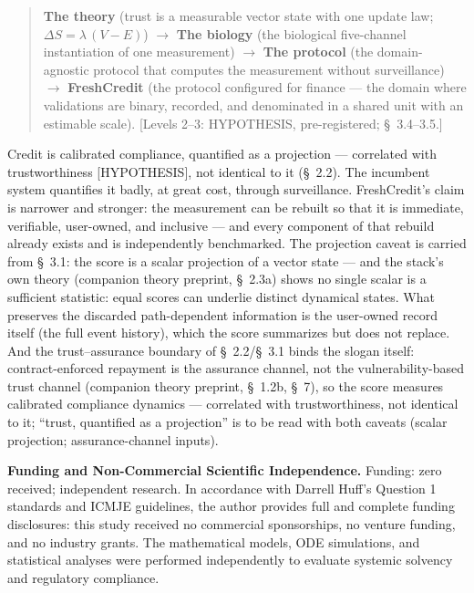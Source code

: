 \documentclass[
]{article}
\begin{document}
\begin{quote}
\textbf{The theory} (trust is a measurable vector state with one update
law; \(\Delta S = \lambda\,(V - E)\)) \(\rightarrow\) \textbf{The
biology} (the biological five-channel instantiation of one measurement)
\(\rightarrow\) \textbf{The protocol} (the domain-agnostic protocol that
computes the measurement without surveillance) \(\rightarrow\)
\textbf{FreshCredit} (the protocol configured for finance --- the domain
where validations are binary, recorded, and denominated in a shared unit
with an estimable scale). {[}Levels 2--3: HYPOTHESIS, pre-registered;
§~3.4--3.5.{]}
\end{quote}

Credit is calibrated compliance, quantified as a projection ---
correlated with trustworthiness {[}HYPOTHESIS{]}, not identical to it
(§~2.2). The incumbent system quantifies it badly, at great cost,
through surveillance. FreshCredit's claim is narrower and stronger: the
measurement can be rebuilt so that it is immediate, verifiable,
user-owned, and inclusive --- and every component of that rebuild
already exists and is independently benchmarked. The projection caveat
is carried from §~3.1: the score is a scalar projection of a vector
state --- and the stack's own theory (companion theory preprint, §~2.3a)
shows no single scalar is a sufficient statistic: equal scores can
underlie distinct dynamical states. What preserves the discarded
path-dependent information is the user-owned record itself (the full
event history), which the score summarizes but does not replace. And the
trust--assurance boundary of §~2.2/§~3.1 binds the slogan itself:
contract-enforced repayment is the assurance channel, not the
vulnerability-based trust channel (companion theory preprint, §~1.2b,
§~7), so the score measures calibrated compliance dynamics ---
correlated with trustworthiness, not identical to it; ``trust,
quantified as a projection'' is to be read with both caveats (scalar
projection; assurance-channel inputs).

\textbf{Funding and Non-Commercial Scientific Independence.} Funding:
zero received; independent research. In accordance with Darrell Huff's
Question 1 standards and ICMJE guidelines, the author provides full and
complete funding disclosures: this study received no commercial
sponsorships, no venture funding, and no industry grants. The
mathematical models, ODE simulations, and statistical analyses were
performed independently to evaluate systemic solvency and regulatory
compliance.
\end{document}

